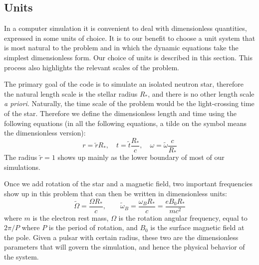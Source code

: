 

\subsection{Units}
\label{sec:pic-units}

In a computer simulation it is convenient to deal with dimensionless quantities,
expressed in some units of choice. It is to our benefit to choose a unit system
that is most natural to the problem and in which the dynamic equations take the
simplest dimensionless form. Our choice of units is described in this section.
This process also highlights the relevant scales of the problem.

The primary goal of the code is to simulate an isolated neutron star, therefore
the natural length scale is the stellar radius $R_{*}$, and there is no other length
scale {\it a priori}. Naturally, the time scale of the problem would be the
light-crossing time of the star. Therefore we define the dimensionless length
and time using the following equations (in all the following equations, a tilde
on the symbol means the dimensionless version):
\begin{equation}
  r = \tilde{r}R_{*},\quad t = \tilde{t}\frac{R_{*}}{c},\quad \omega = \tilde{\omega}\frac{c}{R_{*}}
\end{equation}
The radius $\tilde{r} = 1$ shows up mainly as the lower boundary of most of our
simulations.

Once we add rotation of the star and a magnetic field, two important frequencies
show up in this problem that can then be written in dimensionless units:
\begin{equation}
  \tilde{\Omega} = \frac{\Omega R_{*}}{c},\qquad \tilde{\omega}_B = \frac{\omega_BR_{*}}{c} = \frac{e B_0R_{*}}{mc^2}
\end{equation}
where $m$ is the electron rest mass, $\Omega$ is the rotation angular frequency,
equal to $2\pi / P$ where $P$ is the period of rotation, and $B_0$ is the
surface magnetic field at the pole. Given a pulsar with certain radius, these
two are the dimensionless parameters that will govern the simulation, and hence
the physical behavior of the system.

